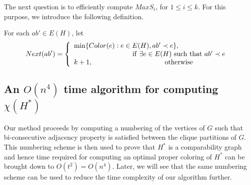 The next question is to efficiently compute $MaxS_i$, for $1\le i\le k$. For this purpose, we introduce the following definition.
\begin{definition}\label{lnext}
For each $ab' \in E(H)$, let
\begin{displaymath}
Next(ab') = \left\{ \begin{array}{ll}
 \min\{Color(e):{e \in E(H), ab' \prec e }\},\\ {\mathrm{\hspace{3cm}if \ }\exists e \in E(H) \mathrm{\ such \ that \ }ab' \prec e}\\
 k+1,\mathrm{ \hspace{3.7cm} otherwise}
  \end{array} \right.
\end{displaymath}
\end{definition}         
\subsection{An $O(n^4)$ time algorithm for computing $\chi(H^*)$}\label{secondalgo}
Our method proceeds by computing a numbering of the vertices of $G$ such that bi-consecutive adjacency property is satisfied between the clique partitions of $G$. This numbering scheme is then used to prove that $H^*$ is a comparability graph and hence time required for computing an optimal proper coloring of $H^*$ can be brought down to $O(t^2)=O(n^4)$. Later, we will see that the same numbering scheme can be used to reduce the time complexity of our algorithm further. 

